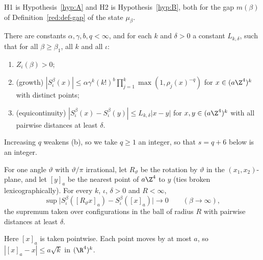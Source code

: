 H1 is Hypothesis~\ref{hyp:A} and H2 is Hypothesis~\ref{hyp:B}, both for the gap $m(\beta)$ of Definition~\ref{red:def-gap} of the state $\mu_\beta$.

\begin{hypothesis}\label{hyp:H3}
There are constants $\alpha,\gamma,b,q<\infty$, and for each $k$ and $\delta>0$ a constant $L_{k,\delta}$, such that for all $\beta\ge\beta_1$, all $k$ and all $\iota$:
\begin{enumerate}
\item[(a)] $Z_i(\beta)>0$;
\item[(b)] (growth) $|S^\beta_\iota(x)|\le\alpha\gamma^k(k!)^b\prod_{j=1}^k\max(1,\rho_j(x)^{-q})$ for $x\in(a\Z^4)^k$ with distinct points;
\item[(c)] (equicontinuity) $|S^\beta_\iota(x)-S^\beta_\iota(y)|\le L_{k,\delta}|x-y|$ for $x,y\in(a\Z^4)^k$ with all pairwise distances at least $\delta$.
\end{enumerate}
\end{hypothesis}

Increasing $q$ weakens (b), so we take $q\ge1$ an integer, so that $s=q+6$ below is an integer.

\begin{hypothesis}\label{hyp:H4}
For one angle $\vartheta$ with $\vartheta/\pi$ irrational, let $R_\vartheta$ be the rotation by $\vartheta$ in the $(x_1,x_2)$-plane, and let $[y]_a$ be the nearest point of $a\Z^4$ to $y$ (ties broken lexicographically). For every $k$, $\iota$, $\delta>0$ and $R<\infty$,
\[
  \sup\bigl|S^\beta_\iota([R_\vartheta x]_a)-S^\beta_\iota([x]_a)\bigr|\to0\qquad(\beta\to\infty),
\]
the supremum taken over configurations in the ball of radius $R$ with pairwise distances at least $\delta$.
\end{hypothesis}

Here $[x]_a$ is taken pointwise. Each point moves by at most $a$, so $|[x]_a-x|\le a\sqrt k$ in $(\R^4)^k$.

